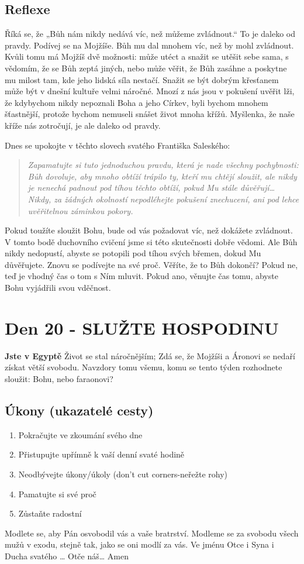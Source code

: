 \documentclass[11pt]{article}
\newcommand{\zacatekTretiTyden}{
  \textbf{Jste v Egyptě} \newline
  Život se stal náročnějším; Zdá se, že Mojžíši a Áronovi se nedaří získat větší svobodu. Navzdory tomu všemu,
komu se tento týden rozhodnete sloužit: Bohu, nebo faraonovi?

\subsection*{Úkony (ukazatelé cesty)}
\begin{enumerate}
  \item Pokračujte ve zkoumání svého dne
  \item Přistupujte upřímně k vaší denní svaté hodině
  \item Neodbývejte úkony/úkoly (don’t cut corners-neřežte rohy)
  \item Pamatujte si své proč
  \item Zůstaňte radostní
\end{enumerate}
Modlete se, aby Pán osvobodil vás a vaše bratrství. \newline
Modleme se za svobodu všech mužů v exodu, stejně tak, jako se oni modlí za vás.\newline
Ve jménu Otce i Syna i Ducha svatého …  Otče náš… Amen
}
\begin{document}
\subsection*{Reflexe}

Říká se, že „Bůh nám nikdy nedává víc, než můžeme zvládnout.“ To je daleko od pravdy. Podívej se na Mojžíše.
Bůh mu dal mnohem víc, než by mohl zvládnout. Kvůli tomu má Mojžíš dvě možnosti: může utéct a snažit se utěšit
sebe sama, s vědomím, že se Bůh zeptá jiných, nebo může věřit, že Bůh zasáhne a poskytne mu milost tam, kde
jeho lidská síla nestačí.
Snažit se být dobrým křesťanem může být v dnešní kultuře velmi náročné. Mnozí z nás jsou v pokušení uvěřit lži,
že kdybychom nikdy nepoznali Boha a jeho Církev, byli bychom mnohem šťastnější, protože bychom nemuseli
snášet život mnoha křížů. Myšlenka, že naše kříže nás zotročují, je ale daleko od pravdy.

\begin{minipage}{\dimexpr\textwidth-20pt}
  Dnes se upokojte v těchto slovech svatého Františka Saleského:
\begin{quote}
  \textit{Zapamatujte si tuto jednoduchou pravdu, která je nade všechny pochybnosti: Bůh dovoluje, aby mnoho obtíží trápilo ty, kteří mu chtějí sloužit, ale nikdy je nenechá padnout pod tíhou těchto obtíží, pokud Mu stále důvěřují… Nikdy, za žádných okolností nepodléhejte pokušení znechucení, ani pod lehce uvěřitelnou záminkou pokory.}
\end{quote}
\end{minipage}


Pokud toužíte sloužit Bohu, bude od vás požadovat víc, než dokážete zvládnout. V tomto bodě duchovního cvičení
jsme si této skutečnosti dobře vědomi. Ale Bůh nikdy nedopustí, abyste se potopili pod tíhou svých břemen, dokud
Mu důvěřujete. Znovu se podívejte na své proč. Věříte, že to Bůh dokončí? Pokud ne, teď je vhodný čas o tom
s Ním mluvit. Pokud ano, věnujte čas tomu, abyste Bohu vyjádřili svou vděčnost.

\newpage
\section{Den 20 - SLUŽTE HOSPODINU}
\zacatekTretiTyden
\end{document}
